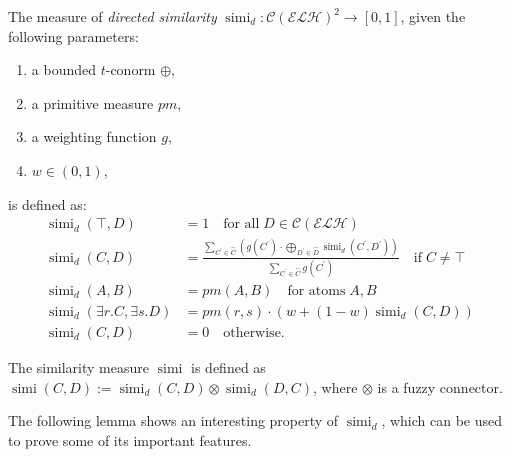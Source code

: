 \documentclass{llncs}
\DeclareMathOperator{\simi}{simi}
\begin{document}
  \begin{definition}[\(\simi_d\)]\label{simi-d}
    The measure of \emph{directed similarity} \(\simi_d \colon {\mathcal{C}(\mathcal{ELH})}^2 \to [0,1]\), given the following parameters:
    \begin{enumerate}
      \item a bounded \(t\)-conorm \(\oplus\),
      \item a primitive measure \(pm\),
      \item a weighting function \(g\),
      \item \(w \in (0,1)\),
    \end{enumerate}
    is defined as:
    \begin{align}
      \simi_d(\top,D) &= 1 \quad
      \text{for all}\; D \in \mathcal{C}(\mathcal{ELH}) \\
      \simi_d(C,D) &=
      \frac{\sum_{C^\prime \in \widehat{C}}\left(g(C^\prime) \cdot \bigoplus_{D^\prime \in \widehat{D}} \simi_d(C^\prime, D^\prime)\right)}%
      {\sum_{C^\prime \in \widehat{C}}g(C^\prime)} \quad \text{if}\; C \ne \top \label{simi:general}\\
      \simi_d(A,B) &= pm(A,B) \quad \text{for atoms}\; A,B \\
      \simi_d(\exists{}r.C,\exists{}s.D) &=
      pm(r,s) \cdot \left(w + (1-w)\simi_d(C,D)\right) \\
      \simi_d(C,D) &= 0 \quad \text{otherwise}.
    \end{align}
  \end{definition}

  \begin{definition}[\(\simi\)]
    The similarity measure \(\simi\) is defined as \(\simi(C,D) := \simi_d(C,D) \otimes \simi_d(D,C)\), where \(\otimes{}\) is a fuzzy connector.
  \end{definition}

  The following lemma shows an interesting property of \(\simi_d\), which can be used to prove some of its important features.
\end{document}
